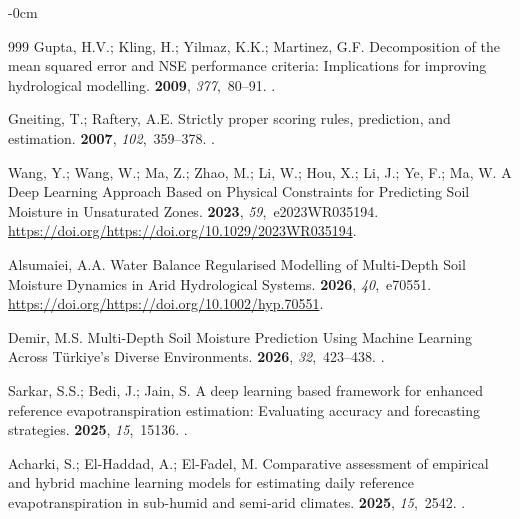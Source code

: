 \documentclass[land,review,accept,pdftex,oneauthor]{Definitions/mdpi}
\begin{document}
\begin{adjustwidth}{-\extralength}{0cm}
\begin{thebibliography}{999}
Gupta, H.V.; Kling, H.; Yilmaz, K.K.; Martinez, G.F.
\newblock Decomposition of the mean squared error and {NSE} performance
  criteria: Implications for improving hydrological modelling.
 {\bf 2009}, {\em 377},~80--91.
.

Gneiting, T.; Raftery, A.E.
\newblock Strictly proper scoring rules, prediction, and estimation.
 {\bf 2007},
  {\em 102},~359--378.
.

Wang, Y.; Wang, W.; Ma, Z.; Zhao, M.; Li, W.; Hou, X.; Li, J.; Ye, F.; Ma, W.
\newblock A Deep Learning Approach Based on Physical Constraints for Predicting
  Soil Moisture in Unsaturated Zones.
 {\bf 2023}, {\em 59},~e2023WR035194. %
 {\url{https://doi.org/https://doi.org/10.1029/2023WR035194}}.

Alsumaiei, A.A.
\newblock Water Balance Regularised Modelling of Multi-Depth Soil Moisture
  Dynamics in Arid Hydrological Systems.
 {\bf 2026}, {\em 40},~e70551.
  {\url{https://doi.org/https://doi.org/10.1002/hyp.70551}}.

Demir, M.S.
\newblock Multi-Depth Soil Moisture Prediction Using Machine Learning Across
  T{\"u}rkiye's Diverse Environments.
 {\bf 2026}, {\em
  32},~423--438.
.

Sarkar, S.S.; Bedi, J.; Jain, S.
\newblock A deep learning based framework for enhanced reference
  evapotranspiration estimation: Evaluating accuracy and forecasting
  strategies.
 {\bf 2025}, {\em 15},~15136.
.

Acharki, S.; El-Haddad, A.; El-Fadel, M.
\newblock Comparative assessment of empirical and hybrid machine learning
  models for estimating daily reference evapotranspiration in sub-humid and
  semi-arid climates.
 {\bf 2025}, {\em 15},~2542.
.


\end{thebibliography}
\end{adjustwidth}
\end{document}
